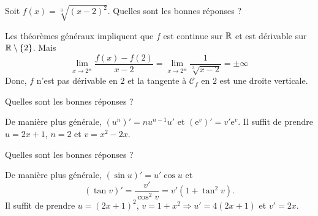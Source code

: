 \begin{question}

Soit $\displaystyle f(x)=\sqrt[3]{(x-2)^2}$. Quelles sont les bonnes réponses ?
\begin{answers}  
\end{answers}
\begin{explanations}
Les théorèmes généraux impliquent que $f$ est continue sur $\mathbb{R}$ et est dérivable sur $\mathbb{R}\setminus\{2\}$. Mais
$$\lim_{x\to 2^{\pm}}\frac{f(x)-f(2)}{x-2}=\lim_{x\to 2^{\pm}}\frac{1}{\sqrt[3]{x-2}}={\pm}\infty $$
Donc, $f$ n'est pas dérivable en $2$ et la tangente à $\mathscr{C}_f$ en $2$ est une droite verticale.
\end{explanations}
\end{question}




\begin{question}

Quelles sont les bonnes réponses ?
\begin{answers}  
\end{answers}
\begin{explanations}
De manière plus générale, $(u^n)'=nu^{n-1}u'$ et $(\mathrm{e}^v)'=v'\mathrm{e}^v$. Il suffit de prendre $u=2x+1$, $n=2$ et $v=x^2-2x$.
\end{explanations}
\end{question}


\begin{question}

Quelles sont les bonnes réponses ?
\begin{answers}  
\end{answers}
\begin{explanations}
De manière plus générale, $(\sin u)'=u'\cos u$ et 
$$(\tan v)'=\frac{v'}{\cos ^2v}=v'(1+\tan ^2v).$$
Il suffit de prendre $u=(2x+1)^2$, $v=1+x^2\Rightarrow u'=4(2x+1)$ et $v'=2x$.
\end{explanations}
\end{question}




